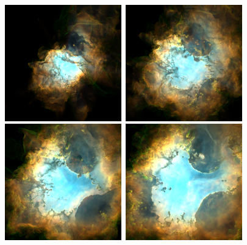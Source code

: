 \documentclass[useAMS,usenatbib]{mn2e}
\begin{document}
\begin{figure}
\centering
\includegraphics[width=0.45\textwidth]{emission-image-15}~\includegraphics[width=0.45\textwidth]{emission-image-20}\\
\includegraphics[width=0.45\textwidth]{emission-image-25}~\includegraphics[width=0.45\textwidth]{emission-image-30}

\end{figure}
\end{document}

